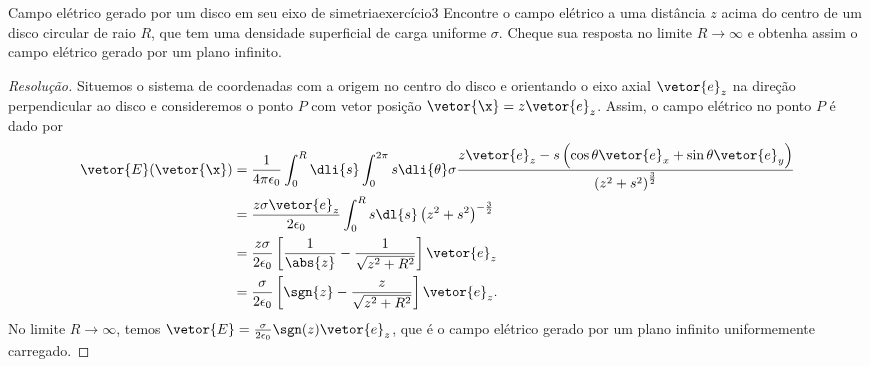 \begin{exercício}{Campo elétrico gerado por um disco em seu eixo de simetria}{exercício3}
    Encontre o campo elétrico a uma distância \(z\) acima do centro de um disco circular de raio \(R\), que tem uma densidade superficial de carga uniforme \(\sigma\). Cheque sua resposta no limite \(R \to \infty\) e obtenha assim o campo elétrico gerado por um plano infinito.
\end{exercício}
\begin{proof}[Resolução]
    Situemos o sistema de coordenadas com a origem no centro do disco e orientando o eixo axial \(\vetor{e}_z\) na direção perpendicular ao disco e consideremos o ponto \(P\) com vetor posição \(\vetor{\x} = z\vetor{e}_z\). Assim, o campo elétrico no ponto \(P\) é dado por
    \begin{align*}
        \vetor{E}(\vetor{\x}) &= \frac1{4\pi \epsilon_0} \int_0^R\dli{s} \int_0^{2\pi} s\dli{\theta} \sigma\frac{z\vetor{e}_z - s\left(\cos\theta \vetor{e}_x + \sin\theta \vetor{e}_y\right)}{\left(z^2 + s^2\right)^{\frac32}}\\
                              &= \frac{z \sigma\vetor{e}_z}{2\epsilon_0} \int_0^R s\dl{s} \left(z^2 + s^2\right)^{-\frac32}\\
                              &= \frac{z \sigma}{2 \epsilon_0}\left[\frac1{\abs{z}} - \frac1{\sqrt{z^2 + R^2}}\right]\vetor{e}_z\\
                              &= \frac{\sigma}{2 \epsilon_0}\left[\sgn{z} - \frac{z}{\sqrt{z^2 + R^2}}\right]\vetor{e}_z.
    \end{align*}
    No limite \(R \to \infty\), temos \(\vetor{E} = \frac{\sigma}{2 \epsilon_0} \sgn(z)\vetor{e}_z\), que é o campo elétrico gerado por um plano infinito uniformemente carregado.
\end{proof}
